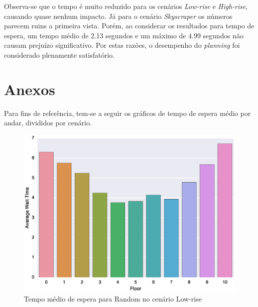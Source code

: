 Observa-se que o tempo é muito reduzido para os cenários \textit{Low-rise} e
\textit{High-rise}, causando quase nenhum impacto. Já para o cenário
\textit{Skyscraper} os números parecem ruins a primeira vista. Porém, ao
considerar os resultados para tempo de espera, um tempo médio de 2.13 segundos e
um máximo de 4.99 segundos não causam prejuízo significativo. Por estas razões,
o desempenho do \textit{planning} foi considerado plenamente satisfatório.

\section{Anexos}

Para fins de referência, tem-se a seguir os gráficos de tempo de espera médio
por andar, divididos por cenário.

\begin{figure}[htb!]
  \centering
  \includegraphics[scale=0.8]{img/results/Low-rise/1_Simple_Random/averageWaitTime}
  \caption{Tempo médio de espera para Random no cenário Low-rise}
  \label{fig:result:low-rise:avgwt:random}
\end{figure}

